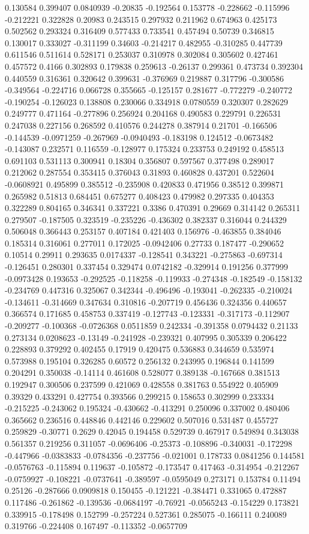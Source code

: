 0.130584 0.399407 0.0840939 -0.20835 -0.192564 0.153778 -0.228662 -0.115996 -0.212221 0.322828 0.20983 0.243515 0.297932 0.211962 0.674963 0.425173 0.502562 0.293324 0.316409 0.577433 0.733541 0.457494 0.50739 0.346815 0.130017 0.333027 -0.311199 0.34603 -0.214217 0.482955 -0.310285 0.447739 0.611546 0.511614 0.528171 0.253037 0.310978 0.302084 0.305602 0.427461 0.457572 0.4166 0.302893 0.179838 0.259613 -0.26137 0.299361 0.473734 0.392304 0.440559 0.316361 0.320642 0.399631 -0.376969 0.219887 0.317796 -0.300586 -0.349564 -0.224716 0.066728 0.355665 -0.125157 0.281677 -0.772279 -0.240772 -0.190254 -0.126023 0.138808 0.230066 0.334918 0.0780559 0.320307 0.282629 0.249777 0.471164 -0.277896 0.256924 0.204168 0.490583 0.229791 0.226531 0.247038 0.227156 0.268592 0.410576 0.244278 0.387914 0.21701 -0.166506 -0.144539 -0.0971259 -0.267969 -0.0940493 -0.183198 0.124512 -0.0673482 -0.143087 0.232571 0.116559 -0.128977 0.175324 0.233753 0.249192 0.458513 0.691103 0.531113 0.300941 0.18304 0.356807 0.597567 0.377498 0.289017 0.212062 0.287554 0.353415 0.376043 0.31893 0.460828 0.437201 0.522604 -0.0608921 0.495899 0.385512 -0.235908 0.420833 0.471956 0.38512 0.399871 0.265982 0.51813 0.684451 0.675277 0.408423 0.479982 0.297335 0.404353 0.322289 0.804165 0.346341 0.337221 0.3386 0.470391 0.29669 0.314142 0.265311 0.279507 -0.187505 0.323519 -0.235226 -0.436302 0.382337 0.316044 0.244329 0.506048 0.366443 0.253157 0.407184 0.421403 0.156976 -0.463855 0.384046 0.185314 0.316061 0.277011 0.172025 -0.0942406 0.27733 0.187477 -0.290652 0.10514 0.29911 0.293635 0.0174337 -0.128541 0.343221 -0.275863 -0.697314 -0.126451 0.280301 0.337454 0.329474 0.0742182 -0.329914 0.191256 0.377999 -0.0973428 0.193653 -0.292525 -0.118258 -0.119933 -0.274348 -0.182549 -0.158132 -0.234769 0.447316 0.325067 0.342344 -0.496496 -0.193041 -0.262335 -0.210024 -0.134611 -0.314669 0.347634 0.310816 -0.207719 0.456436 0.324356 0.440657 0.366574 0.171685 0.458753 0.337419 -0.127743 -0.123331 -0.317173 -0.112907 -0.209277 -0.100368 -0.0726368 0.0511859 0.242334 -0.391358 0.0794432 0.21133 0.273134 0.0208623 -0.13149 -0.241928 -0.239321 0.407995 0.305339 0.206422 0.228893 0.379292 0.402455 0.17919 0.420475 0.536883 0.344659 0.535974 0.573988 0.195104 0.326285 0.60572 0.256132 0.243995 0.196844 0.141599 0.204291 0.350038 -0.14114 0.461608 0.528077 0.389138 -0.167668 0.381513 0.192947 0.300506 0.237599 0.421069 0.428558 0.381763 0.554922 0.405909 0.39329 0.433291 0.427754 0.393566 0.299215 0.158653 0.302999 0.233334 -0.215225 -0.243062 0.195324 -0.430662 -0.413291 0.250096 0.337002 0.480406 0.365662 0.236516 0.448846 0.442146 0.229602 0.507016 0.531487 0.455727 0.259829 -0.30771 0.2629 0.42045 0.194458 0.529739 0.467917 0.549894 0.343038 0.561357 0.219256 0.311057 -0.0696406 -0.25373 -0.108896 -0.340031 -0.172298 -0.447966 -0.0383833 -0.0784356 -0.237756 -0.021001 0.178733 0.0841256 0.144581 -0.0576763 -0.115894 0.119637 -0.105872 -0.173547 0.417463 -0.314954 -0.212267 -0.0759927 -0.108221 -0.0737641 -0.389597 -0.0595049 0.273171 0.153784 0.11494 0.25126 -0.287666 0.0909818 0.150455 -0.121221 -0.384471 0.331065 0.472887 0.117486 -0.261862 -0.139536 -0.0684197 -0.76921 -0.0565243 -0.154229 0.173821 0.339915 -0.178498 0.152799 -0.257224 0.527361 0.285075 -0.166111 0.240089 0.319766 -0.224408 0.167497 -0.113352 -0.0657709 